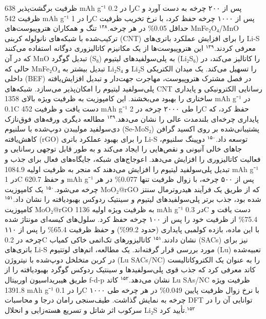 \documentclass[12pt,a4paper,twocolumn]{article} %
\newcommand{\persian}[1]{\textfarsi{#1}}
\newcommand{\english}[1]{\textenglish{#1}}
\begin{document}
\persian{
ظرفیت برگشت‌پذیر \english{638 mAh g⁻¹} را در \english{0.2C} پس از ۲۰۰ چرخه به دست آورد و ظرفیت \english{542 mAh g⁻¹} را در \english{1C} پس از ۱۰۰۰ چرخه حفظ کرد، با نرخ تخریب ظرفیت حداقل \english{0.05\%} در هر چرخه.$^{۱۴۸}$
}
\persian{
تنگ و همکاران هتروپیوست‌های \english{MnFe₂O₄/MnO} ترکیب‌شده با شبکه‌های نانولوله کربنی (\english{CNT}) را برای افزایش عملکرد باتری‌های \english{Li-S} معرفی کردند.$^{۱۴۹}$ این هتروپیوست‌ها از یک مکانیزم کاتالیزوری دوگانه استفاده می‌کنند که در آن \english{MnO} تبدیل گوگرد (\english{S₈}) به پلی‌سولفیدهای لیتیوم (\english{Li₂S₆}) را کاتالیز می‌کند، در حالی که \english{MnFe₂O₄} تبدیل بیشتر به \english{Li₂S₄} و \english{Li₂S} را تسهیل می‌کند. یک میدان الکتریکی داخلی (\english{BEF}) در فصل مشترک هتروپیوست، مهاجرت جهت‌دار و تبدیل افزایش‌یافته پلی‌سولفید لیتیوم را امکان‌پذیر می‌سازد. شبکه‌های \english{CNT} رسانایی الکترونیکی و پایداری ساختاری را بهبود می‌بخشند. این کامپوزیت به ظرفیت ویژه بالای \english{1358 mAh g⁻¹} در \english{0.1C} دست یافت و ظرفیت \english{452 mAh g⁻¹} را طی ۲۰۰۰ چرخه در \english{2C} حفظ کرد، که پایداری چرخه‌ای بلندمدت عالی را نشان می‌دهد.$^{۱۴۹}$
}
\persian{
مطالعه دیگری ورقه‌های فوق‌نازک دی‌سولفید مولیبدن دوپ‌شده با سلنیوم (\english{Se-MoS₂}) پشتیبانی‌شده بر روی اکسید گرافن کاهش‌یافته (\english{rGO}) را برای بهبود عملکرد باتری \english{Li-S} توسعه داد.$^{۱۵۰}$ دوپینگ سلنیوم، جاهای خالی آنیونی و نقص‌هایی را ایجاد می‌کند و به طور قابل توجهی رسانایی و فعالیت کاتالیزوری را افزایش می‌دهد. اعوجاج‌های شبکه، جایگاه‌های فعال برای جذب و تبدیل پلی‌سولفید لیتیوم را افزایش می‌دهند که منجر به ظرفیت اولیه \english{1084.9 mAh g⁻¹} در \english{1C} و حفظ \english{620.7 mAh g⁻¹} پس از ۵۰۰ چرخه، با زوال ظرفیت تنها \english{0.077\%} در هر چرخه می‌شود.$^{۱۵۰}$
}
\persian{
یک کامپوزیت \english{MoO₂@rGO} که از طریق یک فرآیند هیدروترمال سنتز شده بود، جذب برتر پلی‌سولفیدهای لیتیوم و سینتیک ردوکس بهبودیافته را نشان داد.$^{۱۵۱}$ کامپوزیت \english{MoO₂@rGO} به ظرفیت ویژه اولیه \english{1136 mAh g⁻¹} در \english{0.3C} دست یافت و \english{75.4\%} از ظرفیت خود را پس از ۱۰۰ چرخه حفظ کرد. سلول‌های کیسه‌ای مونتاژ شده با این ماده، بازده کولمبی پایداری (حدود \english{99.2\%}) و حفظ ظرفیت \english{65.4\%} را پس از ۱۱۰ چرخه در \english{0.2C} نشان دادند.$^{۱۵۱}$
}
\persian{
کاتالیزورهای تک‌اتمی خاکی کمیاب (\english{SACs}) نیز برای باتری‌های \english{Li-S} مورد بررسی قرار گرفته‌اند. یک مطالعه، اتم‌های لوتتیوم (\english{Lu}) تعبیه‌شده در کربن متخلخل دوپ‌شده با نیتروژن (\english{Lu SACs/NC}) را به عنوان یک الکتروکاتالیست کاتد معرفی کرد که جذب قوی پلی‌سولفیدها و سینتیک ردوکس گوگرد بهبودیافته را از طریق هیبریداسیون اوربیتال \english{f-d-p} نشان می‌دهد.$^{۱۵۲}$ کاتد \english{Lu SAs/NC} ظرفیت ویژه \english{1391.8 mAh g⁻¹} را در \english{0.1C} با نرخ زوال ظرفیت پایین \english{0.049\%} در هر چرخه طی ۱۰۰۰ چرخه به نمایش گذاشت. طیف‌سنجی رامان درجا و محاسبات \english{DFT} توانایی آن را در سرکوب اثر شاتل و تسریع هسته‌زایی و انحلال \english{Li₂S} تأیید کرد.$^{۱۵۲}$
}
\end{document}
